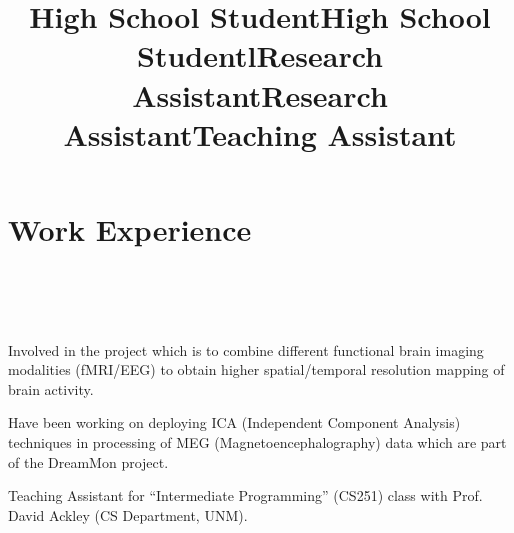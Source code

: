 \documentclass[10pt,overlapped,line]{res}
\begin{document}
\begin{resume}
 \title{High School Student}
 \begin{position}
 \end{position}


 \title{High School Student}
 \begin{position}
 \end{position}


 \section{Work Experience}
 \begin{format}
   \title{l}\\
   \\
   \body\\
 \end{format}

 \title{Research Assistant}
 \begin{position}
   Involved in the project which is to combine different functional brain
  imaging modalities (fMRI/EEG) to obtain higher spatial/temporal resolution
  mapping of brain activity.
 \end{position}

 \title{Research Assistant}
 \begin{position}
   Have been working  on deploying ICA (Independent Component
   Analysis) techniques in processing of MEG (Magnetoencephalography)
   data which are part of the DreamMon project.


 \end{position}

 \title{Teaching Assistant}
 \begin{position}
   Teaching Assistant for ``Intermediate Programming'' (CS251) class
   with Prof. David Ackley (CS Department, UNM).
 \end{position}



\end{resume}
\end{document}
